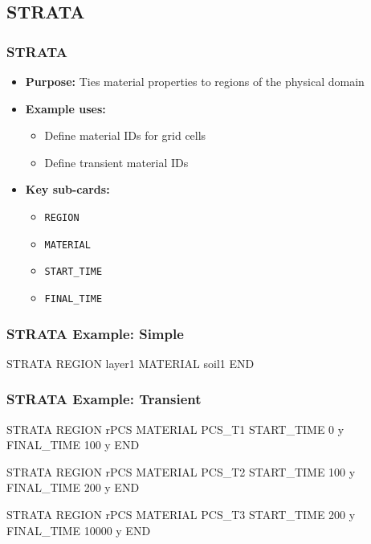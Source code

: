 \subsection{STRATA}

\begin{frame}\frametitle{STRATA}

\begin{itemize}
\item[] \textbf{Purpose:} Ties material properties to regions of the physical domain
\item[] \textbf{Example uses:}
\begin{itemize}
  \item Define material IDs for grid cells
  \item Define transient material IDs
\end{itemize}
\item[] \textbf{Key sub-cards:}
\begin{itemize}
  \item[] \verb|REGION|
  \item[] \verb|MATERIAL|
  \item[] \verb|START_TIME|
  \item[] \verb|FINAL_TIME|
\end{itemize}
\end{itemize}

\end{frame}

\begin{frame}[fragile]\frametitle{STRATA Example: Simple}

\begin{semiverbatim}
STRATA
  REGION layer1
  MATERIAL soil1
END
\end{semiverbatim}

\end{frame}

\begin{frame}[fragile]\frametitle{STRATA Example: Transient}
\footnotesize
\begin{semiverbatim}
STRATA
  REGION rPCS
  MATERIAL PCS_T1
  START_TIME 0 y
  FINAL_TIME 100 y
END

STRATA
  REGION rPCS
  MATERIAL PCS_T2
  START_TIME 100 y
  FINAL_TIME 200 y
END
 
STRATA
  REGION rPCS
  MATERIAL PCS_T3
  START_TIME 200 y
  FINAL_TIME 10000 y
END
\end{semiverbatim}

\end{frame}
